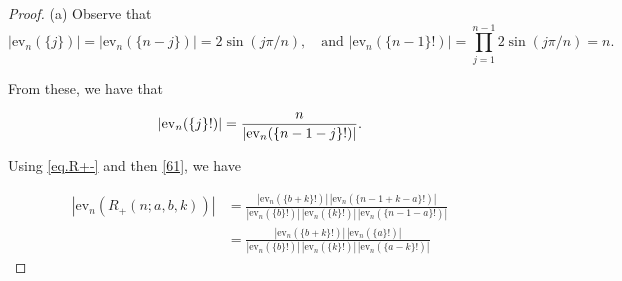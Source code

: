 \documentclass{amsart}
\theoremstyle{definition}
\def\printname#1{
    \if\draft y
        \smash{\makebox[0pt]{\hspace{-0.5in}
            \raisebox{8pt}{\tt\tiny #1}}}
    \fi
}
\def\lbl#1{\label{#1}\printname{#1}}
\def\ev{\mathrm{ev}}
\begin{document}
\begin{proof}
(a) Observe that
$$
|\ev_n(\{j\})| = |\ev_n(\{n-j\})|= 2 \sin (j \pi/n), \quad
\text{and } |\ev_n(\{n-1\}!)| =  \prod_{j=1}^{n-1} 2\sin (j\pi/n)
=n.
$$

From these, we have that

\begin{equation}
\lbl{61}
|\ev_n(\{j\}!)| = \frac{n}{|\ev_n(\{n-1-j\}!)|}. %
\end{equation}

Using \eqref{eq.R+-} and then \eqref{61}, we have

\begin{equation}\begin{aligned}
 |\ev_n(R_+(n;a,b,k ))|
&= \frac{|\ev_n(\{b+k\}!)|\, |\ev_n(\{n-1+k-a\}!)|  }{ |\ev_n(\{b\}!)|\,
 |\ev_n(\{k\}!)|\,
 |\ev_n(\{n-1-a\}!)|}\\
&=\frac{|\ev_n(\{b+k\}!)| \,|\ev_n(\{a\}!)|  }{ |\ev_n(\{b\}!)|\,
|\ev_n(\{k\}!)|\,
 |\ev_n(\{a-k\}!)|}
 \end{aligned}
 \label{90}
 \end{equation}


\end{proof}
\end{document}
